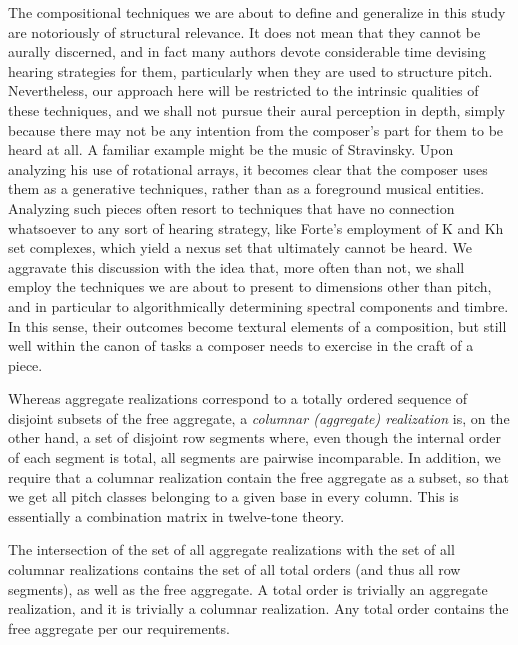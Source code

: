 The compositional techniques we are about to define and generalize in this study are notoriously of structural relevance. It does not mean that they cannot be aurally discerned, and in fact many authors devote considerable time devising hearing strategies for them, particularly when they are used to structure pitch. Nevertheless, our approach here will be restricted to the intrinsic qualities of these techniques, and we shall not pursue their aural perception in depth, simply because there may not be any intention from the composer's part for them to be heard at all. A familiar example might be the music of Stravinsky. Upon analyzing his use of rotational arrays, it becomes clear that the composer uses them as a generative techniques, rather than as a foreground musical entities. Analyzing such pieces often resort to techniques that have no connection whatsoever to any sort of hearing strategy, like Forte's employment of K and Kh set complexes, which yield a nexus set that ultimately cannot be heard. We aggravate this discussion with the idea that, more often than not, we shall employ the techniques we are about to present to dimensions other than pitch, and in particular to algorithmically determining spectral components and timbre. In this sense, their outcomes become textural elements of a composition, but still well within the canon of tasks a composer needs to exercise in the craft of a piece.

Whereas aggregate realizations correspond to a totally ordered sequence of disjoint subsets of the free aggregate, a \emph{columnar (aggregate) realization} is, on the other hand, a set of disjoint row segments where, even though the internal order of each segment is total, all segments are pairwise incomparable. In addition, we require that a columnar realization contain the free aggregate as a subset, so that we get all pitch classes belonging to a given base in every column. This is essentially a combination matrix in twelve-tone theory.

\begin{example}
    \cite[201, 210]{Starr1984}
    The intersection of the set of all aggregate realizations with the set of all columnar realizations contains the set of all total orders (and thus all row segments), as well as the free aggregate. A total order is trivially an aggregate realization, and it is trivially a columnar realization. Any total order contains the free aggregate per our requirements.
\end{example}

